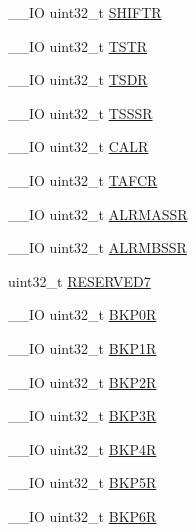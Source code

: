 \begin{DoxyCompactItemize}
\item 
\-\_\-\-\_\-\-I\-O uint32\-\_\-t \hyperlink{struct_r_t_c___type_def_a2372c05a6c5508e0a9adada793f68b4f}{S\-H\-I\-F\-T\-R}
\item 
\-\_\-\-\_\-\-I\-O uint32\-\_\-t \hyperlink{struct_r_t_c___type_def_a042059c8b4168681d6aecf30211dd7b8}{T\-S\-T\-R}
\item 
\-\_\-\-\_\-\-I\-O uint32\-\_\-t \hyperlink{struct_r_t_c___type_def_abeb6fb580a8fd128182aa9ba2738ac2c}{T\-S\-D\-R}
\item 
\-\_\-\-\_\-\-I\-O uint32\-\_\-t \hyperlink{struct_r_t_c___type_def_a1d6c2bc4c067d6a64ef30d16a5925796}{T\-S\-S\-S\-R}
\item 
\-\_\-\-\_\-\-I\-O uint32\-\_\-t \hyperlink{struct_r_t_c___type_def_a2ce7c3842792c506635bb87a21588b58}{C\-A\-L\-R}
\item 
\-\_\-\-\_\-\-I\-O uint32\-\_\-t \hyperlink{struct_r_t_c___type_def_a14d03244a7fda1d94b51ae9ed144ca12}{T\-A\-F\-C\-R}
\item 
\-\_\-\-\_\-\-I\-O uint32\-\_\-t \hyperlink{struct_r_t_c___type_def_a61282fa74cede526af85fd9d20513646}{A\-L\-R\-M\-A\-S\-S\-R}
\item 
\-\_\-\-\_\-\-I\-O uint32\-\_\-t \hyperlink{struct_r_t_c___type_def_a4ef7499da5d5beb1cfc81f7be057a7b2}{A\-L\-R\-M\-B\-S\-S\-R}
\item 
uint32\-\_\-t \hyperlink{struct_r_t_c___type_def_a6be3d40baea405ecaf6b38462357dac0}{R\-E\-S\-E\-R\-V\-E\-D7}
\item 
\-\_\-\-\_\-\-I\-O uint32\-\_\-t \hyperlink{struct_r_t_c___type_def_a4808ec597e5a5fefd8a83a9127dd1aec}{B\-K\-P0\-R}
\item 
\-\_\-\-\_\-\-I\-O uint32\-\_\-t \hyperlink{struct_r_t_c___type_def_af85290529fb82acef7c9fcea3718346c}{B\-K\-P1\-R}
\item 
\-\_\-\-\_\-\-I\-O uint32\-\_\-t \hyperlink{struct_r_t_c___type_def_aaa251a80daa57ad0bd7db75cb3b9cdec}{B\-K\-P2\-R}
\item 
\-\_\-\-\_\-\-I\-O uint32\-\_\-t \hyperlink{struct_r_t_c___type_def_a0b1eeda834c3cfd4d2c67f242f7b2a1c}{B\-K\-P3\-R}
\item 
\-\_\-\-\_\-\-I\-O uint32\-\_\-t \hyperlink{struct_r_t_c___type_def_ab13e106cc2eca92d1f4022df3bfdbcd7}{B\-K\-P4\-R}
\item 
\-\_\-\-\_\-\-I\-O uint32\-\_\-t \hyperlink{struct_r_t_c___type_def_ab6bed862c0d0476ff4f89f7b9bf3e130}{B\-K\-P5\-R}
\item 
\-\_\-\-\_\-\-I\-O uint32\-\_\-t \hyperlink{struct_r_t_c___type_def_a1d854d2d7f0452f4c90035952b92d2ba}{B\-K\-P6\-R}

\end{DoxyCompactItemize}
